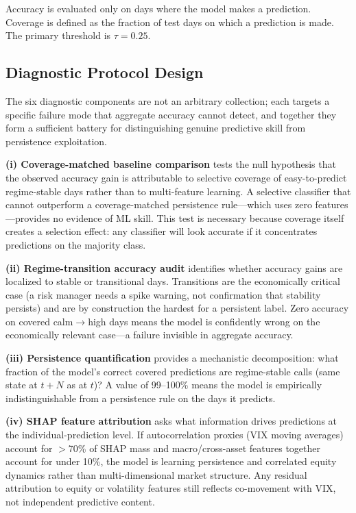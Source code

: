 \documentclass[11pt]{article}
\begin{document}
Accuracy is evaluated only on days where the model makes a prediction. Coverage is defined as the fraction of test days on which a prediction is made. The primary threshold is $\tau = 0.25$.

\subsection{Diagnostic Protocol Design}
\label{sec:protocol}

The six diagnostic components are not an arbitrary collection; each targets a specific failure mode that aggregate accuracy cannot detect, and together they form a sufficient battery for distinguishing genuine predictive skill from persistence exploitation.

\textbf{(i) Coverage-matched baseline comparison} tests the null hypothesis that the observed accuracy gain is attributable to selective coverage of easy-to-predict regime-stable days rather than to multi-feature learning. A selective classifier that cannot outperform a coverage-matched persistence rule---which uses zero features---provides no evidence of ML skill. This test is necessary because coverage itself creates a selection effect: any classifier will look accurate if it concentrates predictions on the majority class.

\textbf{(ii) Regime-transition accuracy audit} identifies whether accuracy gains are localized to stable or transitional days. Transitions are the economically critical case (a risk manager needs a spike warning, not confirmation that stability persists) and are by construction the hardest for a persistent label. Zero accuracy on covered calm$\to$high days means the model is confidently wrong on the economically relevant case---a failure invisible in aggregate accuracy.

\textbf{(iii) Persistence quantification} provides a mechanistic decomposition: what fraction of the model's correct covered predictions are regime-stable calls (same state at $t+N$ as at $t$)? A value of 99--100\% means the model is empirically indistinguishable from a persistence rule on the days it predicts.

\textbf{(iv) SHAP feature attribution} asks what information drives predictions at the individual-prediction level. If autocorrelation proxies (VIX moving averages) account for $>$70\% of SHAP mass and macro/cross-asset features together account for under 10\%, the model is learning persistence and correlated equity dynamics rather than multi-dimensional market structure. Any residual attribution to equity or volatility features still reflects co-movement with VIX, not independent predictive content.
\end{document}
